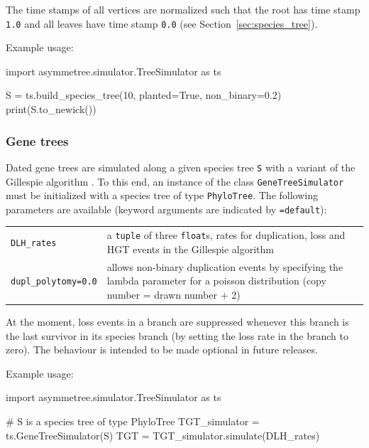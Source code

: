 \documentclass[hidelinks,11pt]{scrreprt}
\begin{document}
The time stamps of all vertices are normalized such that the root has time stamp \texttt{1.0} and all leaves have time stamp \texttt{0.0} (see Section~\ref{sec:species_tree}).

Example usage:
\vspace{2mm}
\begin{python}
import asymmetree.simulator.TreeSimulator as ts

S = ts.build_species_tree(10, planted=True, non_binary=0.2)
print(S.to_newick())
\end{python}
\vspace{2mm}

\subsubsection{Gene trees}

Dated gene trees are simulated along a given species tree \texttt{S} with a variant of the Gillespie algorithm \citep{gillespie1976}.
To this end, an instance of the class \texttt{GeneTreeSimulator} must be initialized with a species tree of type \texttt{PhyloTree}.
The following parameters are available (keyword arguments are indicated by \texttt{=default}):

\vspace{3mm}
\renewcommand{\arraystretch}{1.5}
\begin{tabularx}{0.95\textwidth} { >{\raggedright\arraybackslash}p{4cm} >{\raggedright\arraybackslash}X }
	\texttt{DLH\_rates} & a \texttt{tuple} of three \texttt{float}s, rates for duplication, loss and HGT events in the Gillespie algorithm\\
	\texttt{dupl\_polytomy=0.0}  & allows non-binary duplication events by specifying
	the lambda parameter for a poisson distribution (copy number = drawn number + 2)\\
\end{tabularx}
\vspace{3mm}

At the moment, loss events in a branch are suppressed whenever this branch is the last survivor in its species branch (by setting the loss rate in the branch to zero).
The behaviour is intended to be made optional in future releases.

Example usage:
\vspace{2mm}
\begin{python}
import asymmetree.simulator.TreeSimulator as ts

# S is a species tree of type PhyloTree
TGT_simulator = ts.GeneTreeSimulator(S)
TGT = TGT_simulator.simulate(DLH_rates)
\end{python}
\vspace{2mm}
\end{document}
